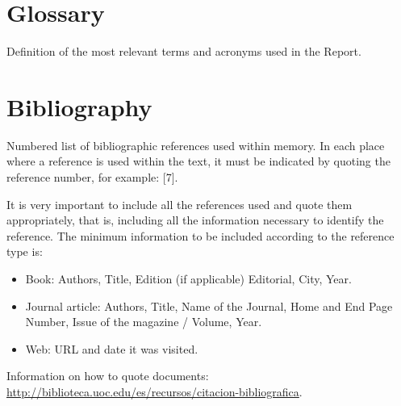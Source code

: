 \chapter{Glossary}

Definition of the most relevant terms and acronyms used in the Report.


\chapter{Bibliography}

Numbered list of bibliographic references used within memory. In each place where a reference is used within the text, it must be indicated by quoting the reference number, for example: [7].

It is very important to include all the references used and quote them appropriately, that is, including all the information necessary to identify the reference. The minimum information to be included according to the reference type is:

\begin{itemize}
\item Book: Authors, Title, Edition (if applicable) Editorial, City, Year.
\item  Journal article: Authors, Title, Name of the Journal, Home and End Page Number, Issue of the magazine / Volume, Year.
\item  Web: URL and date it was visited.
\end{itemize}

Information on how to quote documents: \url{http://biblioteca.uoc.edu/es/recursos/citacion-bibliografica}.